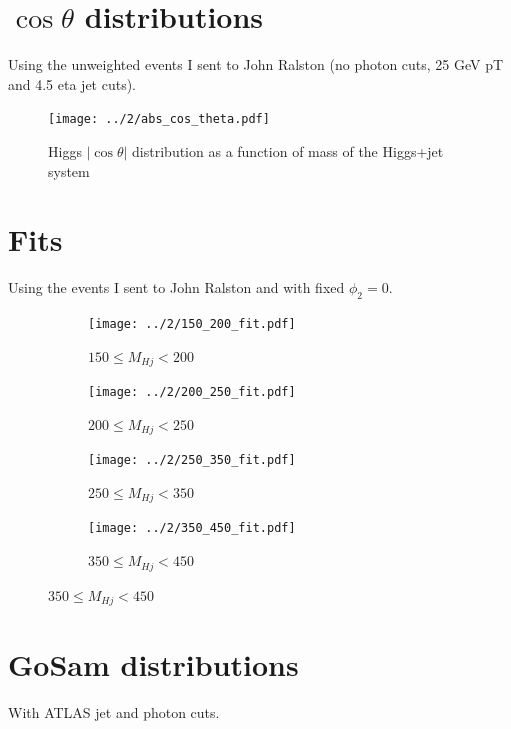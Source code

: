 \documentclass[12pt]{article}
\begin{document}
\section{\texorpdfstring{$\cos\theta$}{cos theta} distributions}
Using the unweighted events I sent to John Ralston
(no photon cuts, 25 GeV pT and 4.5 eta jet cuts).
\begin{figure}[H]
  \centering
  \texttt{[image: ../2/abs\_cos\_theta.pdf]}
  \caption{Higgs $|\!\cos\theta|$ distribution as a function of mass of the Higgs+jet system}
\end{figure}

\pagebreak

\section{Fits}
Using the events I sent to John Ralston and with fixed $\phi_2 = 0$.

\begin{figure}[H]
  \centering
  \begin{subfigure}[b]{0.49\textwidth}
    \centering
    \caption{$150\leq M_{Hj}<200$}
    \texttt{[image: ../2/150\_200\_fit.pdf]}
  \end{subfigure}
  \begin{subfigure}[b]{0.49\textwidth}
    \centering
    \caption{$200\leq M_{Hj}<250$}
    \texttt{[image: ../2/200\_250\_fit.pdf]}
  \end{subfigure}
  \begin{subfigure}[b]{0.49\textwidth}
    \centering
    \caption{$250\leq M_{Hj}<350$}
    \texttt{[image: ../2/250\_350\_fit.pdf]}
  \end{subfigure}
  \begin{subfigure}[b]{0.49\textwidth}
    \centering
    \caption{$350\leq M_{Hj}<450$}
    \texttt{[image: ../2/350\_450\_fit.pdf]}
  \end{subfigure}
\end{figure}

\pagebreak

\section{GoSam distributions}
With ATLAS jet and photon cuts.
\end{document}
